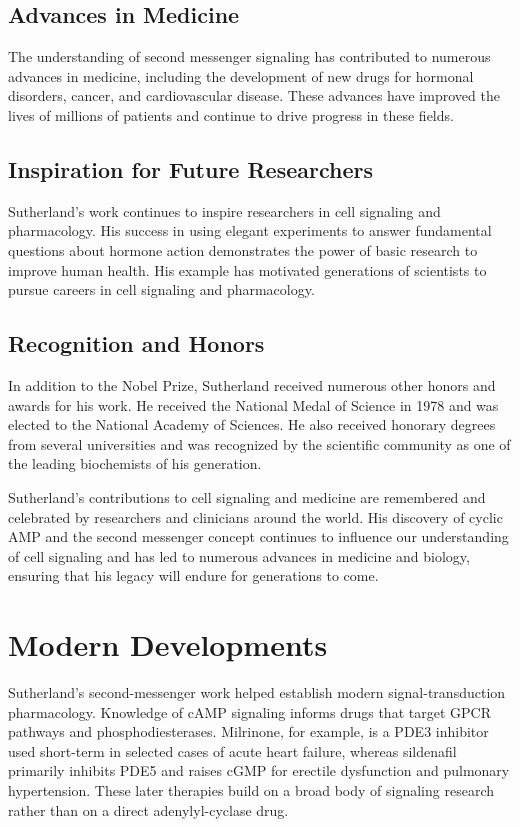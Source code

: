 \subsection{Advances in Medicine}

The understanding of second messenger signaling has contributed to numerous advances in medicine, including the development of new drugs for hormonal disorders, cancer, and cardiovascular disease. These advances have improved the lives of millions of patients and continue to drive progress in these fields.

\subsection{Inspiration for Future Researchers}

Sutherland's work continues to inspire researchers in cell signaling and pharmacology. His success in using elegant experiments to answer fundamental questions about hormone action demonstrates the power of basic research to improve human health. His example has motivated generations of scientists to pursue careers in cell signaling and pharmacology.

\subsection{Recognition and Honors}

In addition to the Nobel Prize, Sutherland received numerous other honors and awards for his work. He received the National Medal of Science in 1978 and was elected to the National Academy of Sciences. He also received honorary degrees from several universities and was recognized by the scientific community as one of the leading biochemists of his generation.

Sutherland's contributions to cell signaling and medicine are remembered and celebrated by researchers and clinicians around the world. His discovery of cyclic AMP and the second messenger concept continues to influence our understanding of cell signaling and has led to numerous advances in medicine and biology, ensuring that his legacy will endure for generations to come.


\section{Modern Developments}

Sutherland's second-messenger work helped establish modern signal-transduction pharmacology. Knowledge of cAMP signaling informs drugs that target GPCR pathways and phosphodiesterases. Milrinone, for example, is a PDE3 inhibitor used short-term in selected cases of acute heart failure, whereas sildenafil primarily inhibits PDE5 and raises cGMP for erectile dysfunction and pulmonary hypertension. These later therapies build on a broad body of signaling research rather than on a direct adenylyl-cyclase drug.


